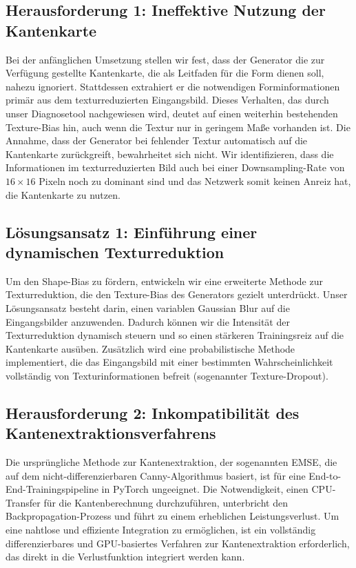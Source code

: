 \subsection{Herausforderung 1: Ineffektive Nutzung der Kantenkarte}
Bei der anfänglichen Umsetzung stellen wir fest, dass der Generator die zur Verfügung gestellte Kantenkarte, die als Leitfaden für die Form dienen soll, nahezu ignoriert. Stattdessen extrahiert er die notwendigen Forminformationen primär aus dem texturreduzierten Eingangsbild.  Dieses Verhalten, das durch unser Diagnosetool nachgewiesen wird, deutet auf einen weiterhin bestehenden Texture-Bias hin, auch wenn die Textur nur in geringem Maße vorhanden ist. Die Annahme, dass der Generator bei fehlender Textur automatisch auf die Kantenkarte zurückgreift, bewahrheitet sich nicht. Wir identifizieren, dass die Informationen im texturreduzierten Bild auch bei einer Downsampling-Rate von $16 \times 16$ Pixeln noch zu dominant sind und das Netzwerk somit keinen Anreiz hat, die Kantenkarte zu nutzen.




\subsection{Lösungsansatz 1: Einführung einer dynamischen Texturreduktion}
Um den Shape-Bias zu fördern, entwickeln wir eine erweiterte Methode zur Texturreduktion, die den Texture-Bias des Generators gezielt unterdrückt. Unser Lösungsansatz besteht darin, einen variablen Gaussian Blur auf die Eingangsbilder anzuwenden. Dadurch können wir die Intensität der Texturreduktion dynamisch steuern und so einen stärkeren Trainingsreiz auf die Kantenkarte ausüben. Zusätzlich wird eine probabilistische Methode implementiert, die das Eingangsbild mit einer bestimmten Wahrscheinlichkeit vollständig von Texturinformationen befreit (sogenannter Texture-Dropout).

\newpage




\subsection{Herausforderung 2: Inkompatibilität des Kantenextraktionsverfahrens}
Die ursprüngliche Methode zur Kantenextraktion, der sogenannten \ac{EMSE}, die auf dem nicht-differenzierbaren Canny-Algorithmus basiert, ist für eine End-to-End-Trainingspipeline in PyTorch ungeeignet. Die Notwendigkeit, einen \ac{CPU}-Transfer für die Kantenberechnung durchzuführen, unterbricht den Backpropagation-Prozess und führt zu einem erheblichen Leistungsverlust. Um eine nahtlose und effiziente Integration zu ermöglichen, ist ein vollständig differenzierbares und \ac{GPU}-basiertes Verfahren zur Kantenextraktion erforderlich, das direkt in die Verlustfunktion integriert werden kann.

